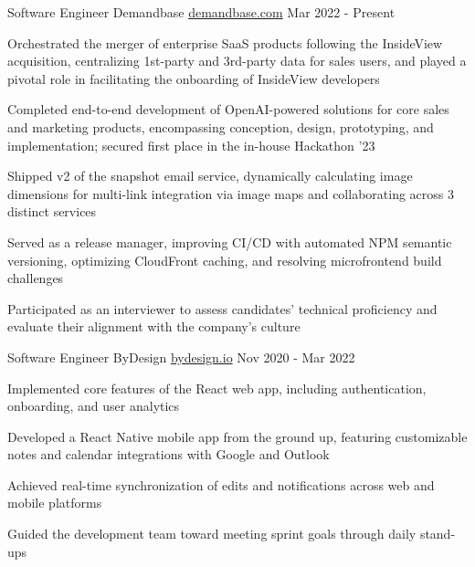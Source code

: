 

\begin{cventries}

\cventry
{Software Engineer} %
{Demandbase} %
{\href{https://www.demandbase.com/}{demandbase.com}} %
{Mar 2022 - Present} %
{
  \begin{cvitems} %
    \item {Orchestrated the merger of enterprise SaaS products following the InsideView acquisition, centralizing 1st-party and 3rd-party data for sales users, and played a pivotal role in facilitating the onboarding of InsideView developers}
    \item {Completed end-to-end development of OpenAI-powered solutions for core sales and marketing products, encompassing conception, design, prototyping, and implementation; secured first place in the in-house Hackathon '23}
    \item {Shipped v2 of the snapshot email service, dynamically calculating image dimensions for multi-link integration via image maps and collaborating across 3 distinct services}
    \item {Served as a release manager, improving CI/CD with automated NPM semantic versioning, optimizing CloudFront caching, and resolving microfrontend build challenges}
    \item {Participated as an interviewer to assess candidates' technical proficiency and evaluate their alignment with the company's culture}
  \end{cvitems}
}

\cventry
{Software Engineer} %
{ByDesign} %
{\href{https://bydesign.io}{bydesign.io}} %
{Nov 2020 - Mar 2022} %
{
  \begin{cvitems} %
    \item {Implemented core features of the React web app, including authentication, onboarding, and user analytics}
    \item {Developed a React Native mobile app from the ground up, featuring customizable notes and calendar integrations with Google and Outlook}
    \item {Achieved real-time synchronization of edits and notifications across web and mobile platforms}
    \item {Guided the development team toward meeting sprint goals through daily stand-ups}
  \end{cvitems}
}


\end{cventries}
